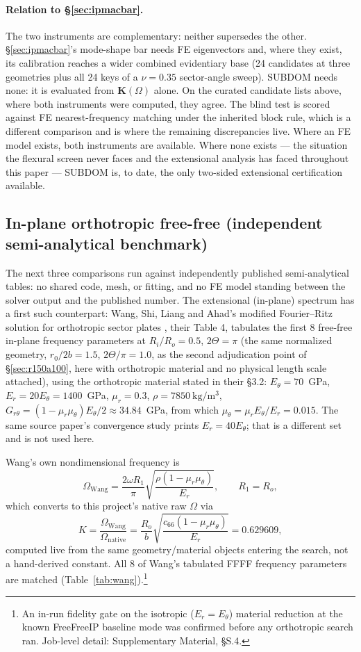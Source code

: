 \documentclass[11pt]{article}
\begin{document}
\paragraph{Relation to \S\ref{sec:ipmacbar}.} The two instruments are complementary: neither supersedes the other. \S\ref{sec:ipmacbar}'s mode-shape bar needs
FE eigenvectors and, where they exist, its calibration reaches a wider
combined evidentiary base (24 candidates at three geometries plus all 24
keys of a $\nu=0.35$ sector-angle sweep). SUBDOM needs none: it is
evaluated from $\mathbf{K}(\Omega)$ alone. On the curated candidate lists above,
where both instruments were computed, they agree. The blind test is
scored against FE nearest-frequency matching under the inherited block
rule, which is a different comparison and is where the remaining
discrepancies live. Where an FE model exists, both instruments are
available. Where none exists --- the situation the flexural screen never
faces and the extensional analysis has faced throughout this paper ---
SUBDOM is, to date, the only two-sided extensional certification
available.

\subsection{In-plane orthotropic free-free (independent semi-analytical
benchmark)}\label{sec:wang}
The next three comparisons run against independently published semi-analytical tables: no shared code, mesh, or fitting, and no FE model standing between the solver output and the published number. The extensional
(in-plane) spectrum has a first such counterpart: Wang, Shi, Liang and Ahad's
modified Fourier--Ritz solution for orthotropic sector plates
\cite{wangip2016}, their Table 4, tabulates the first 8 free-free in-plane
frequency parameters at $R_i/R_o=0.5$, $2\Theta=\pi$ (the same normalized
geometry, $r_0/2b=1.5$, $2\Theta/\pi=1.0$, as the second adjudication
point of \S\ref{sec:r150a100}, here with orthotropic material and no
physical length scale attached), using the orthotropic material stated in
their \S3.2: $E_\theta=70$~GPa, $E_r=20E_\theta=1400$~GPa, $\mu_r=0.3$,
$\rho=7850\ \mathrm{kg/m^3}$, $G_{r\theta}=(1-\mu_r\mu_\theta)E_\theta/2
\approx34.84$~GPa, from which $\mu_\theta=\mu_r E_\theta/E_r=0.015$. The
same source paper's convergence study prints $E_r=40E_\theta$; that is a
different set and is not used here.

Wang's own nondimensional frequency is
\[
\Omega_{\mathrm{Wang}}=\frac{2\omega R_1}{\pi}\sqrt{\frac{\rho(1-\mu_r\mu_\theta)}{E_r}},
\qquad R_1=R_o,
\]
which converts to this project's native raw $\Omega$ via
\[
K=\frac{\Omega_{\mathrm{Wang}}}{\Omega_{\mathrm{native}}}
=\frac{R_o}{b}\sqrt{\frac{c_{66}(1-\mu_r\mu_\theta)}{E_r}}=0.629609,
\]
computed live from the same geometry/material objects entering the
search, not a hand-derived constant. All 8 of Wang's tabulated FFFF
frequency parameters are
matched (Table~\ref{tab:wang}).\footnote{An in-run fidelity gate on the isotropic
($E_r=E_\theta$) material reduction at the known FreeFreeIP baseline mode
was confirmed before any orthotropic search ran. Job-level detail:
Supplementary Material, §S.4.}
\end{document}
